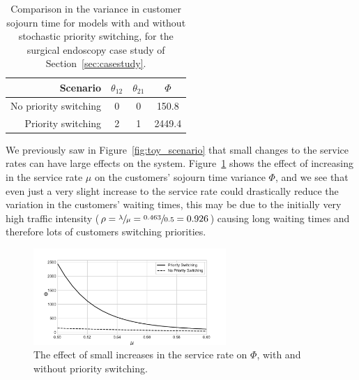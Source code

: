 \documentclass{article}
\begin{document}
\begin{table}
\begin{center}
\begin{tabular}{rccc}
\toprule
Scenario & $\theta_{12}$ & $\theta_{21}$ & $\Phi$ \\
\midrule
No priority switching & 0 & 0 & 150.8 \\
Priority switching & 2 & 1 & 2449.4 \\
\bottomrule
\end{tabular}
\end{center}
\caption{Comparison in the variance in customer sojourn time for models with and
without stochastic priority switching, for the surgical endoscopy case study of
Section~\ref{sec:casestudy}.}
\label{tbl:phi_with_without}
\end{table}

We previously saw in Figure~\ref{fig:toy_scenario} that small changes to the
service rates can have large effects on the system. Figure~\ref{fig:phi_vary_mu}
shows the effect of increasing in the service rate $\mu$ on the customers'
sojourn time variance $\Phi$, and we see that even just a very slight increase
to the service rate could drastically reduce the variation in the customers'
waiting times, this may be due to the initially very high traffic intensity
($\rho = \sfrac{\lambda}{\mu} = \sfrac{0.463}{0.5} = 0.926$) causing long
waiting times and therefore lots of customers switching priorities.

\begin{figure}
\begin{center}
  \includegraphics[width=0.65\textwidth]{img/vary_service_rate_effect_variance.pdf}
\end{center}
\caption{The effect of small increases in the service rate on $\Phi$, with and
without priority switching.}
\label{fig:phi_vary_mu}
\end{figure}
\end{document}
